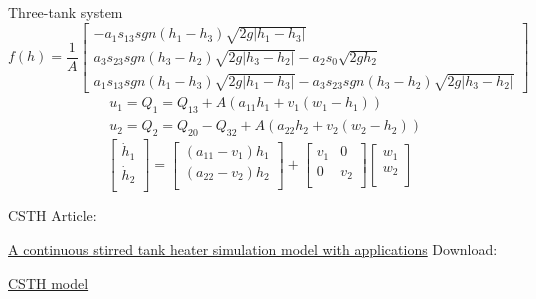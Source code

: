 \documentclass[10pt]{beamer}
\begin{document}
\begin{frame}{Three-tank system}
        \begin{equation} \nonumber
    f(h) =
     \frac{1}{A}
    \begin{bmatrix}
    -a_1s_{13}sgn(h_1-h_3)\sqrt{2g|h_1-h_3|} \\  
    a_3s_{23}sgn(h_3-h_2)\sqrt{2g|h_3-h_2|}-a_2s_0\sqrt{2gh_2} \\
    a_1s_{13}sgn(h_1-h_3)\sqrt{2g|h_1-h_3|}-a_3s_{23}sgn(h_3-h_2)\sqrt{2g|h_3-h_2|}
    \end{bmatrix}
    \end{equation}
    \begin{equation} \nonumber
  \begin{aligned}
&  u_1 = Q_1 = Q_{13} + A(a_{11}h_1+v_1(w_1-h_1)) \\
&  u_2 = Q_2 = Q_{20} - Q_{32} +A(a_{22}h_2+v_2(w_2-h_2))
  \end{aligned}
  \label{u1}
\end{equation}
\begin{equation} \nonumber
  \begin{bmatrix}
    \dot{h}_1 \\
    \dot{h}_2 \\
  \end{bmatrix}
  = 
  \begin{bmatrix}
    (a_{11}-v_1)h_1 \\
    (a_{22}-v_2)h_2 \\
  \end{bmatrix}
  +\begin{bmatrix}
    v_1 & 0\\
    0   & v_2 \\
  \end{bmatrix}
  \begin{bmatrix}
    w_1 \\
    w_2 \\
  \end{bmatrix}
\end{equation}
    \end{frame}
\begin{frame}{CSTH}
    Article: \par
      \href{https://www.sciencedirect.com/science/article/pii/S0959152407001126}{A continuous stirred tank heater simulation model with applications}
      Download: \par
        \href{http://personal-pages.ps.ic.ac.uk/~nina/CSTHSimulation/CSTHMaster.mdl}{CSTH model}
    \end{frame}
\end{document}
